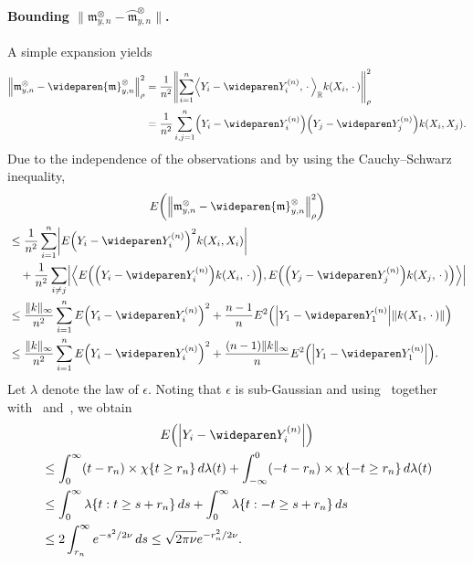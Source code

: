 \documentclass[AHL,Unicode,longabstracts,published]{cedram}
\theoremstyle{remark}
\newcommand{\R}{\mathbb{R}}
\newcommand{\mean}{\mathfrak{m}}
\newcommand*{\MK}{\mkern 2mu}
\let\originalleft\left
\let\originalright\right
\renewcommand{\left}{\mathopen{}\mathclose\bgroup\originalleft}
\renewcommand{\right}{\aftergroup\egroup\originalright}
\begin{document}
\paragraph{Bounding $\| \mean_{y,n}^{\otimes} - \wideparen{\mean}_{y,n}^\otimes \|$.} A simple expansion yields
\begin{align*}
\left\| \mean_{y,n}^{\otimes} - \wideparen{\mean}_{y,n}^\otimes \right \|^2_{\rho} &= \frac{1}{n^2} \left\| \sum_{i=1}^n \left\langle Y_i - \wideparen Y^{(n)}_i, \,\cdot\, \right\rangle_\R k(X_i,\,\cdot\,) \right\|_\rho^2\\
&= \frac{1}{n^2} \sum_{i,j =1}^n \left(Y_i - \wideparen Y^{(n)}_i\right) \left(Y_j - \wideparen Y_j^{(n)}\right) k(X_i, X_j).
\end{align*}
Due to the independence of the observations and by using the Cauchy--Schwarz inequality,
\begin{multline*}
E\left(\left\|\mean_{y,n}^{\otimes} - \wideparen{\mean}_{y,n}^\otimes \right\|^2_{\rho}\right)\\
\begin{aligned}
&\leq \frac{1}{n^2} \sum_{i =1}^n \left| E \left(Y_i - \wideparen Y^{(n)}_i\right)^2 k(X_i, X_i)\right| \\
&\quad+ \frac{1}{n^2} \sum_{i \not = j} \left|\left\langle E\left(\left(Y_i - \wideparen Y^{(n)}_i\right) k(X_i,\,\cdot\,)\right), E\left(\left(Y_j - \wideparen Y_j^{(n)}\right) k(X_j,\,\cdot\,)\right) \right\rangle \right| \\
&\leq  \frac{\|k\|_\infty}{n^2} \sum_{i =1}^n E \left(Y_i - \wideparen Y^{(n)}_i\right)^2 + \frac{n-1}{n} E^2\left(\left|Y_1 - \wideparen Y^{(n)}_1\right| \|k(X_1,\,\cdot\,)\|\right) \\
&\leq \frac{\|k\|_\infty}{n^2} \sum_{i =1}^n E \left(Y_i - \wideparen Y^{(n)}_i\right)^2 + \frac{(n-1)\|k\|_\infty}{n} E^2\left(\left|Y_1 - \wideparen Y^{(n)}_1\right|\right).
\end{aligned}
\end{multline*}
Let $\lambda$ denote the law of $\epsilon$. Noting that $\epsilon$ is sub-Gaussian and using~\cite[Section~2.3]{GAB13} together with~\cite[252O]{FREM} and~\cite[Proposition~2.5$\MK$(a)]{DUDLEY14}, we obtain
\begin{multline}\label{eq:cappedYabs}
E\left(\left|Y_i - \wideparen Y^{(n)}_i\right|\right)\\
\begin{aligned}
&\leq \int_0^\infty (t - r_n) \times \chi\{t \geq r_n \} \, d\lambda(t) + \int_{-\infty}^0 (-t - r_n) \times \chi\{ - t \geq r_n\} \, d\lambda(t)  \\
&\leq \int_0^\infty \lambda\{ t : t \geq s + r_n\} \, ds + \int_0^\infty \lambda\{t : -t \geq s + r_n \} \, ds  \\
&\leq 2 \int_{r_n}^\infty e^{-s^2/2 \nu} \, ds
\leq \sqrt{2\pi \nu} e^{-r_n^2/ 2 \nu}.
\end{aligned}
\end{multline}
\end{document}
